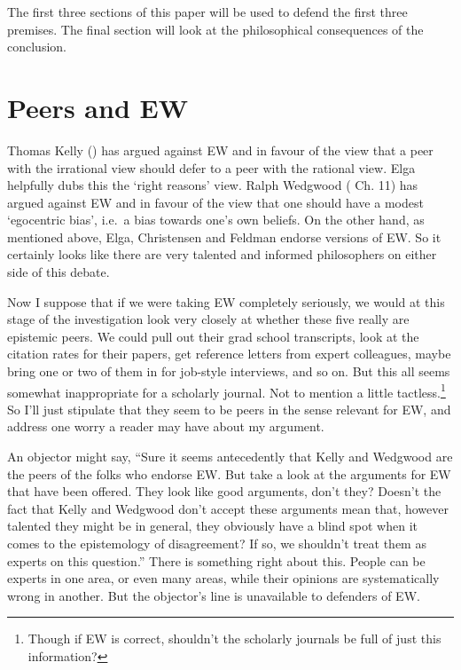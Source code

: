 \documentclass[
  10pt,
  letterpaper,
  DIV=11,
  numbers=noendperiod,
  twoside]{scrartcl}
\begin{document}
The first three sections of this paper will be used to defend the first
three premises. The final section will look at the philosophical
consequences of the conclusion.

\section{Peers and EW}\label{peers-and-ew}

Thomas Kelly () has argued against
EW and in favour of the view that a peer with the irrational view should
defer to a peer with the rational view. Elga helpfully dubs this the
`right reasons' view. Ralph Wedgwood
( Ch. 11) has argued against EW
and in favour of the view that one should have a modest `egocentric
bias', i.e.~a bias towards one's own beliefs. On the other hand, as
mentioned above, Elga, Christensen and Feldman endorse versions of EW.
So it certainly looks like there are very talented and informed
philosophers on either side of this debate.

Now I suppose that if we were taking EW completely seriously, we would
at this stage of the investigation look very closely at whether these
five really are epistemic peers. We could pull out their grad school
transcripts, look at the citation rates for their papers, get reference
letters from expert colleagues, maybe bring one or two of them in for
job-style interviews, and so on. But this all seems somewhat
inappropriate for a scholarly journal. Not to mention a little
tactless.\footnote{Though if EW is correct, shouldn't the scholarly
  journals be full of just this information?} So I'll just stipulate
that they seem to be peers in the sense relevant for EW, and address one
worry a reader may have about my argument.

An objector might say, ``Sure it seems antecedently that Kelly and
Wedgwood are the peers of the folks who endorse EW. But take a look at
the arguments for EW that have been offered. They look like good
arguments, don't they? Doesn't the fact that Kelly and Wedgwood don't
accept these arguments mean that, however talented they might be in
general, they obviously have a blind spot when it comes to the
epistemology of disagreement? If so, we shouldn't treat them as experts
on this question.'' There is something right about this. People can be
experts in one area, or even many areas, while their opinions are
systematically wrong in another. But the objector's line is unavailable
to defenders of EW.
\end{document}
